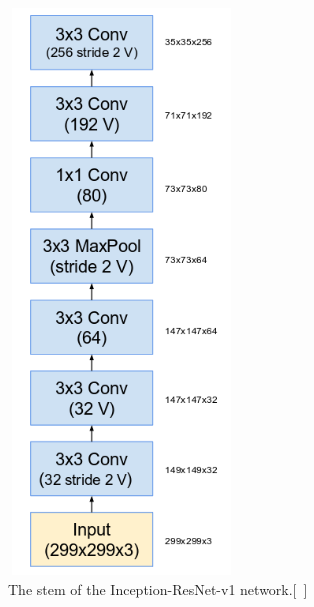 \documentclass[a4paper,12pt, twoside]{NITKReport}
\begin{document}
\begin{figure}
\centering
\begin{minipage}[b]{0.4\textwidth}
   \includegraphics[height=15cm,width=6cm]{figure14.png}
    \caption{The stem of the Inception-ResNet-v1 network.[~\cite{szegedy2017inception}]}
    \label{14}
  \end{minipage}
  \hfill
  \begin{minipage}[b]{0.4\textwidth}

\end{minipage}
\end{figure}
\end{document}
